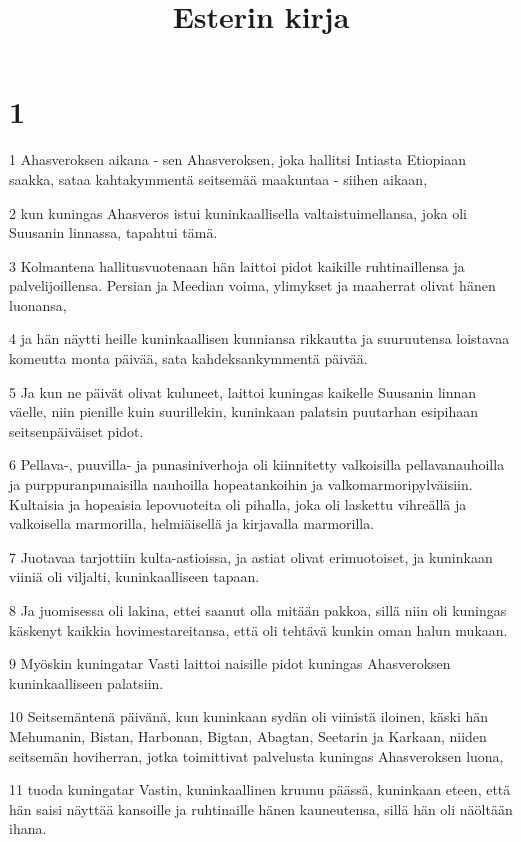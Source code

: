 

\title{Esterin kirja}


\chapter{1}

\par 1 Ahasveroksen aikana - sen Ahasveroksen, joka hallitsi Intiasta Etiopiaan saakka, sataa kahtakymmentä seitsemää maakuntaa - siihen aikaan,
\par 2 kun kuningas Ahasveros istui kuninkaallisella valtaistuimellansa, joka oli Suusanin linnassa, tapahtui tämä.
\par 3 Kolmantena hallitusvuotenaan hän laittoi pidot kaikille ruhtinaillensa ja palvelijoillensa. Persian ja Meedian voima, ylimykset ja maaherrat olivat hänen luonansa,
\par 4 ja hän näytti heille kuninkaallisen kunniansa rikkautta ja suuruutensa loistavaa komeutta monta päivää, sata kahdeksankymmentä päivää.
\par 5 Ja kun ne päivät olivat kuluneet, laittoi kuningas kaikelle Suusanin linnan väelle, niin pienille kuin suurillekin, kuninkaan palatsin puutarhan esipihaan seitsenpäiväiset pidot.
\par 6 Pellava-, puuvilla- ja punasiniverhoja oli kiinnitetty valkoisilla pellavanauhoilla ja purppuranpunaisilla nauhoilla hopeatankoihin ja valkomarmoripylväisiin. Kultaisia ja hopeaisia lepovuoteita oli pihalla, joka oli laskettu vihreällä ja valkoisella marmorilla, helmiäisellä ja kirjavalla marmorilla.
\par 7 Juotavaa tarjottiin kulta-astioissa, ja astiat olivat erimuotoiset, ja kuninkaan viiniä oli viljalti, kuninkaalliseen tapaan.
\par 8 Ja juomisessa oli lakina, ettei saanut olla mitään pakkoa, sillä niin oli kuningas käskenyt kaikkia hovimestareitansa, että oli tehtävä kunkin oman halun mukaan.
\par 9 Myöskin kuningatar Vasti laittoi naisille pidot kuningas Ahasveroksen kuninkaalliseen palatsiin.
\par 10 Seitsemäntenä päivänä, kun kuninkaan sydän oli viinistä iloinen, käski hän Mehumanin, Bistan, Harbonan, Bigtan, Abagtan, Seetarin ja Karkaan, niiden seitsemän hoviherran, jotka toimittivat palvelusta kuningas Ahasveroksen luona,
\par 11 tuoda kuningatar Vastin, kuninkaallinen kruunu päässä, kuninkaan eteen, että hän saisi näyttää kansoille ja ruhtinaille hänen kauneutensa, sillä hän oli näöltään ihana.
